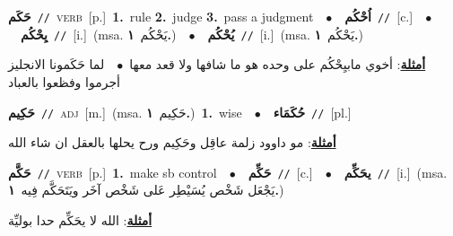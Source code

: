 \documentclass[10pt,a4paper,twoside]{article} %
\begin{document}
\begin{multicols}{2}
{\setlength\topsep{0pt}\textbf{\foreignlanguage{arabic}{حَكَم}}\ {\color{gray}\texttt{//}\color{black}}\ \textsc{verb}\ [p.]\ \textbf{1.}~rule  \textbf{2.}~judge  \textbf{3.}~pass a judgment\ \ $\bullet$\ \ \setlength\topsep{0pt}\textbf{\foreignlanguage{arabic}{اُحْكُم}}\ {\color{gray}\texttt{//}\color{black}}\ [c.]\ \ $\bullet$\ \ \setlength\topsep{0pt}\textbf{\foreignlanguage{arabic}{يِحْكُم}}\ {\color{gray}\texttt{//}\color{black}}\ [i.]\ \color{gray}(msa. \foreignlanguage{arabic}{يَحْكُم}~\foreignlanguage{arabic}{\textbf{١.}})\color{black}\ \ $\bullet$\ \ \setlength\topsep{0pt}\textbf{\foreignlanguage{arabic}{يُحْكُم}}\ {\color{gray}\texttt{//}\color{black}}\ [i.]\ \color{gray}(msa. \foreignlanguage{arabic}{يَحْكُم}~\foreignlanguage{arabic}{\textbf{١.}})\color{black}\  \begin{flushright}\color{gray}\foreignlanguage{arabic}{\textbf{\underline{\foreignlanguage{arabic}{أمثلة}}}: أخوي مابيِحْكُم على وحده هو ما شافها ولا قعد معها\ $\bullet$\ \  لما حَكَمونا الانجليز أجرموا وفظعوا بالعباد}\end{flushright}\color{black}} \vspace{2mm}

{\setlength\topsep{0pt}\textbf{\foreignlanguage{arabic}{حَكِيم}}\ {\color{gray}\texttt{//}\color{black}}\ \textsc{adj}\ [m.]\ \color{gray}(msa. \foreignlanguage{arabic}{حَكِيم}~\foreignlanguage{arabic}{\textbf{١.}})\color{black}\ \textbf{1.}~wise\ \ $\bullet$\ \ \setlength\topsep{0pt}\textbf{\foreignlanguage{arabic}{حُكَمَاء}}\ {\color{gray}\texttt{//}\color{black}}\ [pl.]\  \begin{flushright}\color{gray}\foreignlanguage{arabic}{\textbf{\underline{\foreignlanguage{arabic}{أمثلة}}}: مو داوود زلمة عاقِل وحَكِيم ورح يحلها بالعقل ان شاء الله}\end{flushright}\color{black}} \vspace{2mm}

{\setlength\topsep{0pt}\textbf{\foreignlanguage{arabic}{حَكَّم}}\ {\color{gray}\texttt{//}\color{black}}\ \textsc{verb}\ [p.]\ \textbf{1.}~make sb control\ \ $\bullet$\ \ \setlength\topsep{0pt}\textbf{\foreignlanguage{arabic}{حَكِّم}}\ {\color{gray}\texttt{//}\color{black}}\ [c.]\ \ $\bullet$\ \ \setlength\topsep{0pt}\textbf{\foreignlanguage{arabic}{يحَكِّم}}\ {\color{gray}\texttt{//}\color{black}}\ [i.]\ \color{gray}(msa. \foreignlanguage{arabic}{يَجْعَل شَخْص يُسَيْطِر عَلى شَخْص آخَر ويَتَحَكَّم فِيه}~\foreignlanguage{arabic}{\textbf{١.}})\color{black}\  \begin{flushright}\color{gray}\foreignlanguage{arabic}{\textbf{\underline{\foreignlanguage{arabic}{أمثلة}}}: الله لا يحَكِّم حدا بوليِّة}\end{flushright}\color{black}} \vspace{2mm}


\end{multicols}
\end{document}
